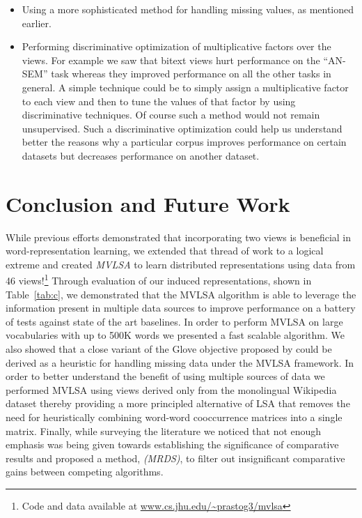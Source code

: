 \documentclass[11pt]{article}
\begin{document}
{\begin{itemize}[leftmargin=*]
  have been caused due to lack of PMI type features have been reported
  to work well by .
\item Using a more sophisticated method for handling missing values,
  as mentioned earlier.
\item Performing discriminative optimization of multiplicative
  factors over the views. For example we saw that bitext views hurt
  performance on the ``AN-SEM'' task whereas they improved performance
  on all the other tasks in general. A simple technique could be to
  simply assign a multiplicative factor to each view and
  then to tune the values of that factor by using discriminative
  techniques. Of course such a method would not remain unsupervised. Such a discriminative optimization could help us understand
  better the reasons why a particular corpus improves performance on
  certain datasets but decreases performance on another dataset. %
\end{itemize}
}

\section{Conclusion and Future Work}
While previous efforts demonstrated that incorporating two views is
beneficial in word-representation learning, we extended that thread of
work to a logical extreme and created \emph{MVLSA} to learn
distributed representations using data from 46 views!\footnote{Code
  and data available at \url{www.cs.jhu.edu/~prastog3/mvlsa}} Through
evaluation of our induced representations, shown in Table~\ref{tab:c},
we demonstrated that the MVLSA algorithm is able to leverage the
information present in multiple data sources to improve performance on
a battery of tests against state of the art baselines. In order to
perform MVLSA on large vocabularies with up to 500K words we presented
a fast scalable algorithm. We also showed that a close variant of the
Glove objective proposed by  could be
derived as a heuristic for handling missing data under the MVLSA
framework. In order to better understand the benefit of using multiple
sources of data we performed MVLSA using views derived only from the
monolingual Wikipedia dataset thereby providing a more principled
alternative of LSA that removes the need for heuristically combining
word-word cooccurrence matrices into a single matrix. Finally, while
surveying the literature we noticed that not enough emphasis was being
given towards establishing the significance of comparative results and
proposed a method, \emph{(MRDS)}, to filter out insignificant
comparative gains between competing algorithms.
\end{document}
